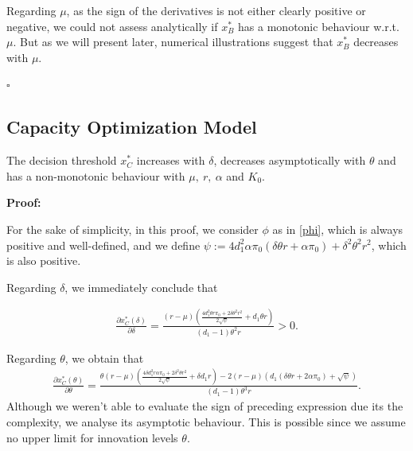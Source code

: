 Regarding $\mu$, as the sign of the derivatives is not either clearly positive or negative, we could not assess analytically if $x^*_B$ has a monotonic behaviour w.r.t. $\mu$. But as we will present later, numerical illustrations suggest that $x_B^*$ decreases with $\mu$.
\begin{flushright}
	$\square$
\end{flushright}



\subsection{Capacity Optimization Model}
\label{2_com}


\begin{prop}
	\label{2_prop2}
The decision threshold $x^*_C$ increases with $\delta$, decreases asymptotically with $\theta$ and has a non-monotonic behaviour with $\mu, \ r, \  \alpha$ and $K_0$.
\end{prop}

\textbf{Proof:}

For the sake of simplicity, in this proof, we consider $\phi$ as in \eqref{phi}, which is always positive and well-defined, and we define
$\psi:=4 d_1^2 \alpha \pi_0  (\delta  \theta  r+\alpha \pi_0 )+\delta ^2 \theta ^2 r^2$, which is also positive.

Regarding $\delta$, we immediately conclude that

\begin{align*}
\frac{\partial x^*_C ( \delta ) }{\partial \delta}= \frac{(r-\mu ) \left(\frac{4 d_1^2 \theta  r \pi_0 +2 \delta  \theta ^2 r^2}{2 \sqrt{\psi }}+d_1 \theta  r\right)}{(d_1-1) \theta ^2 r}>0.
\end{align*}

Regarding $\theta$, we obtain that
\begin{align*}
	\frac{\partial x^*_C ( \theta) }{\partial \theta}= \frac{ \theta (r-\mu ) \left(\frac{4 \delta  d_1^2 r \alpha \pi_0 +2 \delta ^2 \theta  r^2}{2 \sqrt{\psi }}+\delta  d_1 r\right)- 2 (r-\mu ) \left(d_1 (\delta  \theta  r+2 \alpha \pi_0 )+\sqrt{\psi }\right)}{(d_1-1) \theta ^3 r}.
\end{align*}
Although we weren't able to evaluate the sign of preceding expression due its the complexity, we analyse its asymptotic behaviour. This is possible since we assume no upper limit for innovation levels  $\theta$.


